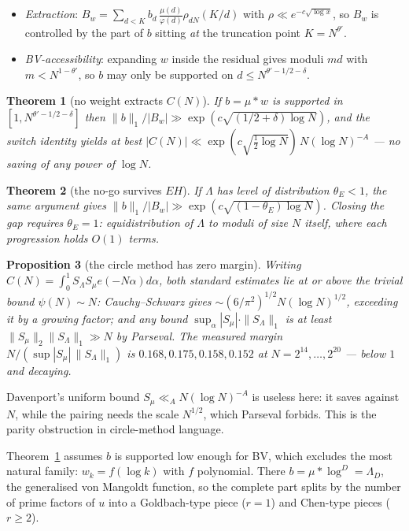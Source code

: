 \documentclass[11pt,a4paper]{article}
\theoremstyle{plain}
\newtheorem{theorem}{Theorem}
\newtheorem{proposition}[theorem]{Proposition}
\theoremstyle{definition}
\begin{document}
\begin{itemize}
\item \emph{Extraction}:
  $B_w=\sum_{d<K}b_d\,\frac{\mu(d)}{\varphi(d)}\rho_{dN}(K/d)$ with
  $\rho \ll e^{-c\sqrt{\log x}}$, so $B_w$ is controlled by the part of
  $b$ sitting \emph{at} the truncation point $K=N^{\theta'}$.
\item \emph{BV-accessibility}: expanding $w$ inside the residual gives
  moduli $md$ with $m<N^{1-\theta'}$, so $b$ may only be supported on
  $d\le N^{\theta'-1/2-\delta}$.
\end{itemize}

\begin{theorem}[no weight extracts $C(N)$]\label{thm:D}
If $b=\mu*w$ is supported in $[1,N^{\theta'-1/2-\delta}]$ then
$\|b\|_1/|B_w| \gg \exp(c\sqrt{(1/2+\delta)\log N})$, and the switch
identity yields at best
$|C(N)|\ll \exp(c\sqrt{\tfrac12\log N})\,N(\log N)^{-A}$ --- no saving
of any power of $\log N$.
\end{theorem}

\begin{theorem}[the no-go survives $EH$]\label{thm:Dprime}
If $\Lambda$ has level of distribution $\theta_E<1$, the same argument
gives $\|b\|_1/|B_w| \gg \exp(c\sqrt{(1-\theta_E)\log N})$. Closing the
gap requires $\theta_E=1$: equidistribution of $\Lambda$ to moduli of
size $N$ itself, where each progression holds $O(1)$ terms.
\end{theorem}

\begin{proposition}[the circle method has zero margin]\label{prop:E}
Writing $C(N)=\int_0^1 S_\Lambda S_\mu e(-N\alpha)d\alpha$, both
standard estimates lie at or above the trivial bound $\psi(N)\sim N$:
Cauchy--Schwarz gives $\sim(6/\pi^2)^{1/2}N(\log N)^{1/2}$, exceeding
it by a growing factor; and any bound
$\sup_\alpha|S_\mu|\cdot\|S_\Lambda\|_1$ is at least
$\|S_\mu\|_2\|S_\Lambda\|_1\gg N$ by Parseval. The measured margin
$N/(\sup|S_\mu|\,\|S_\Lambda\|_1)$ is $0.168,0.175,0.158,0.152$ at
$N=2^{14},\dots,2^{20}$ --- below $1$ and decaying.
\end{proposition}

Davenport's uniform bound $S_\mu\ll_A N(\log N)^{-A}$ is useless here:
it saves against $N$, while the pairing needs the scale $N^{1/2}$,
which Parseval forbids. This is the parity obstruction in
circle-method language.

Theorem~\ref{thm:D} assumes $b$ is supported low enough for BV, which
excludes the most natural family: $w_k=f(\log k)$ with $f$ polynomial.
There $b=\mu*\log^D=\Lambda_D$, the generalised von Mangoldt function,
so the complete part splits by the number of prime factors of $u$ into
a Goldbach-type piece ($r=1$) and Chen-type pieces ($r\ge2$).
\end{document}

